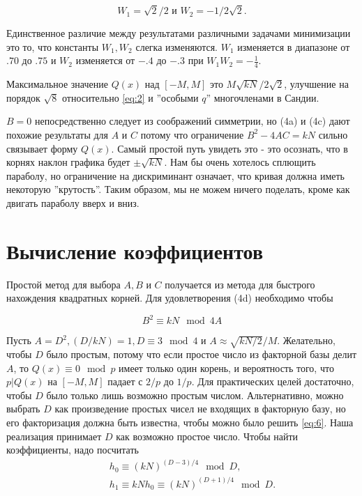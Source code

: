 \documentclass[a4paper,12pt]{report}
\begin{document}
\begin{equation*}
W_1 = \sqrt{2}/2 \text{ и } W_2 = -1/2\sqrt{2}.
\end{equation*}

Единственное различие между результатами различными задачами минимизации это то, что константы $W_1, W_2$ слегка изменяются. $W_1$ изменяется в диапазоне от $.70$ до $.75$ и $W_2$  изменяется от $-.4$ до $-.3$ при $W_1W_2 = -\frac{1}{4}$.

Максимальное значение $Q(x)$ над $[-M, M]$ это $M\sqrt{kN}/2\sqrt{2}$, улучшение на порядок $\sqrt{8}$ относительно \eqref{eq:2} и ''особыми $q$'' многочленами в Сандии.

$B = 0$ непосредственно следует из соображений симметрии, но (4a) и (4c) дают похожие результаты для $A$ и $C$ потому что ограничение $B^2 - 4AC = kN$ сильно связывает форму $Q(x)$. Самый простой путь увидеть это - это осознать, что в корнях наклон графика будет $\pm \sqrt{kN}$. Нам бы очень хотелось сплющить параболу, но ограничение на дискриминант означает, что кривая должна иметь некоторую ''крутость''. Таким образом, мы не можем ничего поделать, кроме как двигать параболу вверх и вниз.

\section{Вычисление коэффициентов}

Простой метод для выбора $A, B$ и $C$ получается из метода для быстрого нахождения квадратных корней. Для удовлетворения (4d) необходимо чтобы

\begin{equation}\label{eq:6}
B^2 \equiv kN \mod 4A
\end{equation}

Пусть $A = D^2, (D/kN) = 1, D \equiv 3 \mod 4$ и $A \approx \sqrt{kN/2}/M$. Желательно, чтобы $D$ было простым, потому что если простое число из факторной базы делит $A$, то $Q(x) \equiv 0 \mod p$ имеет только один корень, и вероятность того, что $p | Q(x)$ на $[-M, M]$ падает с $2/p$ до $1/p$. Для практических целей достаточно, чтобы $D$ было только лишь возможно простым числом. Альтернативно, можно выбрать $D$ как произведение простых чисел не входящих в факторную базу, но его факторизация должна быть известна, чтобы можно было решить \eqref{eq:6}. Наша реализация принимает $D$ как возможно простое число. Чтобы найти коэффициенты, надо посчитать
\begin{subequations}
\begin{align}
	&\mathrel{\phantom{=}}h_0 \equiv {(kN)}^{(D-3)/4} \mod D, \label{eq:7a}\\
	&\mathrel{\phantom{=}}h_1 \equiv kNh_0 \equiv (kN)^{(D+1)/4} \mod D. \label{eq:7b}
\end{align}
\label{eq:7all}
\end{subequations}
\end{document}
